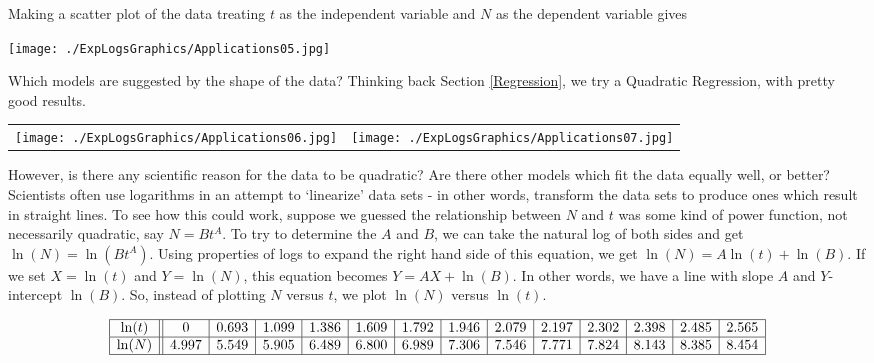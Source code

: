 Making a scatter plot of the data treating $t$ as the independent variable and $N$ as the dependent variable gives

\centerline{\texttt{[image: ./ExpLogsGraphics/Applications05.jpg]}}

Which models are suggested by the shape of the data?  Thinking back Section \ref{Regression}, we try a Quadratic Regression, with pretty good results.

\begin{center}

\begin{tabular}{cc}

\texttt{[image: ./ExpLogsGraphics/Applications06.jpg]} &

\hspace{0.75in} \texttt{[image: ./ExpLogsGraphics/Applications07.jpg]} \\

\end{tabular}

\end{center}

However, is there any scientific reason for the data to be quadratic?  Are there other models which fit the data equally well, or better?  Scientists often use logarithms in an attempt to `linearize' data sets - in other words, transform the data sets to produce ones which result in straight lines.  To see how this could work, suppose we guessed the relationship between $N$ and $t$ was some kind of power function, not necessarily quadratic, say $N = B t^{A}$.  To try to determine the $A$ and $B$, we can take the natural log of both sides and get $\ln(N) = \ln\left(B t^{A}\right)$.  Using properties of logs to expand the right hand side of this equation, we get $\ln(N) = A \ln(t) + \ln(B)$.  If we set $X = \ln(t)$ and $Y = \ln(N)$, this equation becomes $Y = AX + \ln(B)$.  In other words, we have a line with slope $A$ and $Y$-intercept $\ln(B)$.  So, instead of plotting $N$ versus $t$, we plot $\ln(N)$ versus $\ln(t)$.

\[ \begin{array}{|c||c|c|c|c|c|c|c|c|c|c|c|c|c|}  \hline

\ln(t) & 0 & 0.693 & 1.099 & 1.386& 1.609 & 1.792 & 1.946 & 2.079 & 2.197 & 2.302 & 2.398 & 2.485 & 2.565  \\ \hline

\ln(N) & 4.997  & 5.549 &  5.905 & 6.489 & 6.800 & 6.989 & 7.306 & 7.546 & 7.771 & 7.824 & 8.143 & 8.385 & 8.454  \\ \hline \end{array} \]


